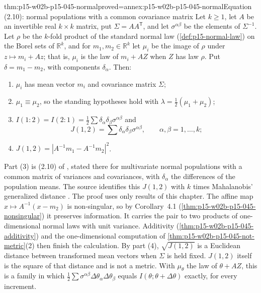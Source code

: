 \begin{hbtheorem}{thm:p15-w02b-p15-045-normal}{proved=annex:p15-w02b-p15-045-normal}{Equation (2.10): normal populations with a common covariance matrix}
Let \(k\geq1\), let \(A\) be an invertible real \(k\times k\) matrix,
put \(\Sigma=AA^{\mathsf T}\), and let \(\sigma^{\alpha\beta}\) be the
elements of \(\Sigma^{-1}\). Let \(\rho\) be the \(k\)-fold product of
the standard normal law (\cref{def:p15-normal-law}) on the Borel sets of
\(\mathbb R^k\), and for \(m_1,m_2\in\mathbb R^k\) let \(\mu_i\) be the
image of \(\rho\) under \(z\mapsto m_i+Az\); that is, \(\mu_i\) is the
law of \(m_i+AZ\) when \(Z\) has law \(\rho\). Put
\(\delta=m_1-m_2\), with components \(\delta_\alpha\). Then:
\begin{enumerate}
\item \(\mu_i\) has mean vector \(m_i\) and covariance matrix
\(\Sigma\);
\item \(\mu_1\equiv\mu_2\), so the standing hypotheses hold with
\(\lambda=\tfrac12(\mu_1+\mu_2)\);
\item \(I(1:2)=I(2:1)=\tfrac12\sum\delta_\alpha\delta_\beta\sigma^{\alpha\beta}\)
and
\[
  J(1,2)=\sum\delta_\alpha\delta_\beta\sigma^{\alpha\beta},
  \qquad\alpha,\beta=1,\dots,k;
\]
\item \(J(1,2)=|A^{-1}m_1-A^{-1}m_2|^2\).
\end{enumerate}
\end{hbtheorem}

Part (3) is (2.10) of \cite[p.~81]{KullbackLeibler1951Information},
stated there for multivariate normal populations with a common matrix of
variances and covariances, with \(\delta_\alpha\) the differences of the
population means. The source identifies this \(J(1,2)\) with \(k\) times
Mahalanobis' generalized distance \cite[pp.~81--82]{KullbackLeibler1951Information}.
The proof uses only results of this chapter. The affine map
\(x\mapsto A^{-1}(x-m_2)\) is non-singular, so by Corollary~4.1
(\cref{thm:p15-w02b-p15-045-nonsingular}) it preserves information. It
carries the pair to two products of one-dimensional normal laws with
unit variance. Additivity (\cref{thm:p15-w02b-p15-045-additivity}) and
the one-dimensional computation of
\cref{thm:p15-w02b-p15-045-not-metric}(2) then finish the calculation.
By part (4), \(\sqrt{J(1,2)}\) is a Euclidean distance between
transformed mean vectors when \(\Sigma\) is held fixed. \(J(1,2)\)
itself is the square of that distance and is not a metric. With
\(\mu_\theta\) the law of \(\theta+AZ\), this is a family in which
\(\tfrac12\sum\sigma^{\alpha\beta}\Delta\theta_\alpha\Delta\theta_\beta\)
equals \(I(\theta;\theta+\Delta\theta)\) exactly, for every increment.

